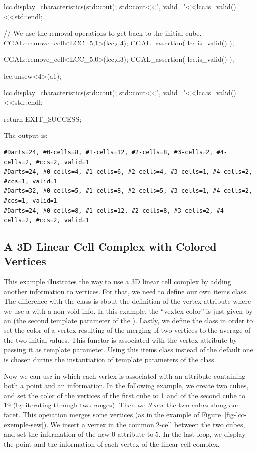 \begin{ccExampleCode}
{  lcc.display_characteristics(std::cout);
  std::cout<<", valid="<<lcc.is_valid()<<std::endl;
  
  // We use the removal operations to get back to the initial cube.
  CGAL::remove_cell<LCC_5,1>(lcc,d4);
  CGAL_assertion( lcc.is_valid() );

  CGAL::remove_cell<LCC_5,0>(lcc,d3);
  CGAL_assertion( lcc.is_valid() );

  lcc.unsew<4>(d1);

  lcc.display_characteristics(std::cout);
  std::cout<<", valid="<<lcc.is_valid()<<std::endl;

  return EXIT_SUCCESS;
}
\end{ccExampleCode}

The output is:
\begin{verbatim}
#Darts=24, #0-cells=8, #1-cells=12, #2-cells=8, #3-cells=2, #4-cells=2, #ccs=2, valid=1
#Darts=24, #0-cells=4, #1-cells=6, #2-cells=4, #3-cells=1, #4-cells=2, #ccs=1, valid=1
#Darts=32, #0-cells=5, #1-cells=8, #2-cells=5, #3-cells=1, #4-cells=2, #ccs=1, valid=1
#Darts=24, #0-cells=8, #1-cells=12, #2-cells=8, #3-cells=2, #4-cells=2, #ccs=2, valid=1
\end{verbatim}

\subsection{A 3D Linear Cell Complex with Colored Vertices}
\label{ssec-exemple-color-vertices}

This example illustrates the way to use a 3D linear cell complex by
adding another information to vertices. For that, we need to define
our own items class.  The difference with the
 class is about the definition of
the vertex attribute where we use a 
with a non void info. In this example, the ``vextex color'' is just
given by an  (the second template parameter of the
).  Lastly, we define the
 class in order to set the color of a vertex
resulting of the merging of two vertices to the average of the two
initial values. This functor is associated with the vertex attribute
by passing it as template parameter.  Using this items class instead of
the default one is chosen during the instantiation of template
parameters of the  class.

Now we can use  in which each vertex is associated with an
attribute containing both a point and an information. In the following
example, we create two cubes, and set the color of the vertices of the
first cube to 1 and of the second cube to 19 (by iterating through two
 ranges). Then we \emph{3-sew} the two
cubes along one facet. This operation merges some vertices (as in the
example of Figure~\ref{fig-lcc-exemple-sew}).  We insert a vertex in
the common 2-cell between the two cubes, and set the information of
the new 0-attribute to 5.  In the last loop, we display the point and
the information of each vertex of the linear cell complex.

